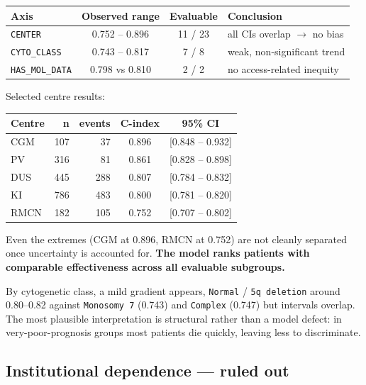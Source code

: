 \documentclass[11pt,a4paper]{article}
\newcommand{\var}[1]{\texttt{#1}}                      %
\begin{document}
\begin{table}[h]
\centering
\begin{tabular}{@{}lccl@{}}
\toprule
\textbf{Axis} & \textbf{Observed range} & \textbf{Evaluable} & \textbf{Conclusion} \\
\midrule
\var{CENTER}        & 0.752 -- 0.896 & 11 / 23 & all CIs overlap $\rightarrow$ no bias \\
\var{CYTO\_CLASS}   & 0.743 -- 0.817 &  7 / 8  & weak, non-significant trend \\
\var{HAS\_MOL\_DATA}& 0.798 vs 0.810 &  2 / 2  & no access-related inequity \\
\bottomrule
\end{tabular}
\end{table}

Selected centre results:

\begin{table}[h]
\centering
\begin{tabular}{@{}lrrcc@{}}
\toprule
\textbf{Centre} & \textbf{n} & \textbf{events} & \textbf{C-index} & \textbf{95\% CI} \\
\midrule
CGM  & 107 &  37 & 0.896 & [0.848 -- 0.932] \\
PV   & 316 &  81 & 0.861 & [0.828 -- 0.898] \\
DUS  & 445 & 288 & 0.807 & [0.784 -- 0.832] \\
KI   & 786 & 483 & 0.800 & [0.781 -- 0.820] \\
RMCN & 182 & 105 & 0.752 & [0.707 -- 0.802] \\
\bottomrule
\end{tabular}
\end{table}

Even the extremes (CGM at 0.896, RMCN at 0.752) are not cleanly separated once uncertainty is
accounted for. \textbf{The model ranks patients with comparable effectiveness across all
evaluable subgroups.}

By cytogenetic class, a mild gradient appears, \var{Normal} / \var{5q deletion} around
0.80--0.82 against \var{Monosomy 7} (0.743) and \var{Complex} (0.747) but intervals
overlap. The most plausible interpretation is structural rather than a model defect: in
very-poor-prognosis groups most patients die quickly, leaving less to discriminate.

\subsection{Institutional dependence --- ruled out}
\end{document}
